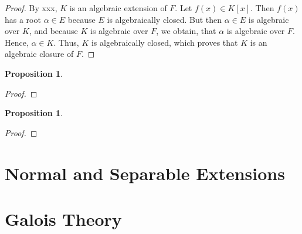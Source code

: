 \documentclass[draft]{article}
\newtheorem{prop}[thm]{Proposition}
\theoremstyle{definition}
\theoremstyle{remark}
\begin{document}
            \begin{proof}
                By xxx, $K$ is an algebraic extension of $F$. Let $f(x) \in K[x]$. Then $f(x)$ has a root $\alpha \in E$ because $E$ is algebraically closed. But then $\alpha \in E$ is algebraic over $K$, and because $K$ is algebraic over $F$, we obtain, that $\alpha$ is algebraic over $F$. Hence, $\alpha \in K$. Thus, $K$ is algebraically closed, which proves that $K$ is an algebraic closure of $F$.
            \end{proof}
            
            \begin{prop}
                
            \end{prop}
            
            \begin{proof}
                
            \end{proof}
            
            \begin{prop}
                
            \end{prop}
            
            \begin{proof}
                
            \end{proof}
            
	\section{Normal and Separable Extensions}
	
	\section{Galois Theory}
	
\newpage

    \begin{thebibliography}{10}
    
    	\bibitem{}
    	
    \end{thebibliography}
	
\end{document}
